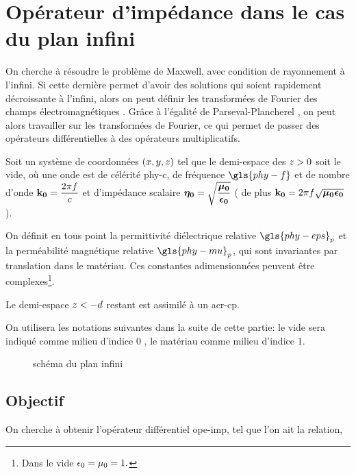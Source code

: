 \section{Opérateur d'impédance dans le cas du plan infini}\label{sec:coeffs_ref}

On cherche à résoudre le problème de Maxwell, avec condition de rayonnement à l'infini. Si cette dernière permet d'avoir des solutions qui soient rapidement décroissante à l'infini, alors on peut définir les transformées de Fourier des champs électromagnétiques \cite[p.~146]{yosida_functional_1995}. Grâce à l'égalité de Parseval-Plancherel \cite[p.~153]{yosida_functional_1995}, on peut alors travailler sur les transformées de Fourier, ce qui permet de passer des opérateurs différentielles à des opérateurs multiplicatifs.



Soit un système de coordonnées $(\x,\y,\z)$ tel que le demi-espace des $\z>0$ soit le vide, où une onde est de célérité \gls{phy-c}, de fréquence $\gls{phy-f}$ et de nombre d'onde $\kO=\frac{2\pi f}{c}$  et d'impédance scalaire $\etaO = \sqrt{\frac{\muO}{\epsO}}$ ( de plus $\kO=2\pi f\sqrt{\muO\epsO}$ ).

On définit en tous point la permittivité diélectrique relative $\gls{phy-eps}_p$ et la perméabilité magnétique relative $\gls{phy-mu}_p$, qui sont invariantes par translation dans le matériau.
Ces constantes adimensionnées peuvent être complexes\footnote{Dans le vide $\eps_0=\mu_0=1.$}.

Le demi-espace $\z<-d$ restant est assimilé à un \gls{acr-cp}.

On utilisera les notations  suivantes dans la suite de cette partie: le vide sera indiqué comme milieu d'indice $0$ , le matériau comme milieu d'indice $1$.
\renewcommand{\x}{{x}}
\renewcommand{\y}{{y}}
\renewcommand{\z}{{z}}
\renewcommand{\peps}{{\eps_1}}
\renewcommand{\pmu}{{\mu_1}}
\begin{figure}[h!]
\centering
\begin{tikzpicture}

\end{tikzpicture}
\caption{schéma du plan infini}
\end{figure}\label{fig:tikz:plan}

\subsection{Objectif}
On cherche à obtenir l'opérateur différentiel \gls{ope-imp}, tel que l'on ait la relation,

